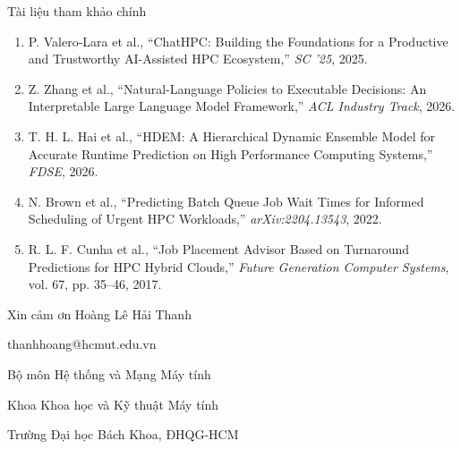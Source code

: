\begin{frame}[t]{Tài liệu tham khảo chính}
\scriptsize
\setlength{\itemsep}{0.35em}
\begin{enumerate}
  \item P. Valero-Lara et al., ``ChatHPC: Building the Foundations for a Productive and Trustworthy AI-Assisted HPC Ecosystem,'' \textit{SC '25}, 2025.

  \item Z. Zhang et al., ``Natural-Language Policies to Executable Decisions: An Interpretable Large Language Model Framework,'' \textit{ACL Industry Track}, 2026.

  \item T. H. L. Hai et al., ``HDEM: A Hierarchical Dynamic Ensemble Model for Accurate Runtime Prediction on High Performance Computing Systems,'' \textit{FDSE}, 2026.

  \item N. Brown et al., ``Predicting Batch Queue Job Wait Times for Informed Scheduling of Urgent HPC Workloads,'' \textit{arXiv:2204.13543}, 2022.

  \item R. L. F. Cunha et al., ``Job Placement Advisor Based on Turnaround Predictions for HPC Hybrid Clouds,'' \textit{Future Generation Computer Systems}, vol. 67, pp. 35--46, 2017.
\end{enumerate}
\end{frame}

\begin{frame}[t]{Xin cảm ơn}
\small
Hoàng Lê Hải Thanh\par
thanhhoang@hcmut.edu.vn\par
Bộ môn Hệ thống và Mạng Máy tính\par
Khoa Khoa học và Kỹ thuật Máy tính\par
Trường Đại học Bách Khoa, ĐHQG-HCM\par
\end{frame}
